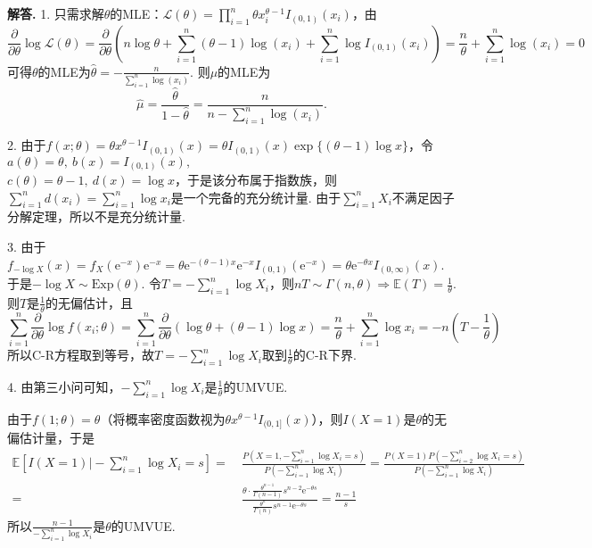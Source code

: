\documentclass[12pt, a4paper, oneside]{ctexart}
\newenvironment{solution}[1][]{\par\noindent\textbf{#1解答. }}{\smallskip\par}  %
\def\E{\mathbb{E}}          %
\def\e{\mathrm{e}}          %
\def\L{\mathcal{L}}         %
\def\add{\vspace{1ex}}      %
\begin{document}
\begin{solution}
    1. 只需求解$\theta$的MLE：$\L(\theta) = \prod_{i=1}^n\theta x_i^{\theta-1}I_{(0,1)}(x_i)$，由
    \begin{equation*}
        \frac{\partial}{\partial \theta}\log\L(\theta) = \frac{\partial}{\partial \theta}\left(n\log\theta+\sum_{i=1}^n(\theta-1)\log(x_i)+\sum_{i=1}^n\log I_{(0,1)}(x_i)\right) = \frac{n}{\theta}+\sum_{i=1}^n\log(x_i) = 0
    \end{equation*}
    可得$\theta$的MLE为$\hat{\theta} = -\frac{n}{\sum_{i=1}^n\log(x_i)}$. 则$\mu$的MLE为
    \begin{equation*}
        \hat{\mu} = \frac{\hat{\theta}}{1-\hat{\theta}} = \frac{n}{n-\sum_{i=1}^n\log(x_i)}.
    \end{equation*}
    
    2. 由于$f(x;\theta) = \theta x^{\theta-1}I_{(0,1)}(x) = \theta I_{(0,1)}(x)\exp\{(\theta-1)\log x\}$，令$a(\theta) = \theta,\ b(x)  = I_{(0,1)}(x),$\\$c(\theta) = \theta-1,\ d(x) = \log x$，于是该分布属于指数族，则$\sum_{i=1}^nd(x_i) = \sum_{i=1}^n\log x_i$是一个完备的充分统计量. 由于$\sum_{i=1}^nX_i$不满足因子分解定理，所以不是充分统计量.

    3. 由于$f_{-\log X}(x) = f_X(\e^{-x})\e^{-x} = \theta\e^{-(\theta-1)x}\e^{-x}I_{(0,1)}(\e^{-x})=\theta\e^{-\theta x}I_{(0,\infty)}(x)$. \add 于是$-\log X\sim \text{Exp}(\theta)$. 令$T = -\sum_{i=1}^n\log X_i$，则$nT\sim\Gamma(n,\theta) \Rightarrow \E(T) = \frac{1}{\theta}$. 则$T$是$\frac{1}{\theta}$的无偏估计，且
    \begin{equation*}
        \sum_{i=1}^n\frac{\partial}{\partial\theta}\log f(x_i;\theta) = \sum_{i=1}^n\frac{\partial}{\partial\theta}(\log\theta+(\theta-1)\log x)=\frac{n}{\theta}+\sum_{i=1}^n\log x_i= -n\left(T-\frac{1}{\theta}\right)
    \end{equation*}
    所以C-R方程取到等号，故$T=-\sum_{i=1}^n\log X_i$取到$\frac{1}{\theta}$的C-R下界.

    4. 由第三小问可知，$-\sum_{i=1}^n\log X_i$是$\frac{1}{\theta}$的UMVUE.

    由于$f(1;\theta) = \theta$（将概率密度函数视为$\theta x^{\theta-1}I_{(0,1]}(x)$），则$I(X=1)$是$\theta$的无偏估计量，于是
    \begin{align*}
        \E\left[I(X=1)\biggl|-\sum_{i=1}^n\log X_i=s\right] =&\ \frac{P(X=1,-\sum_{i=1}^n\log X_i=s)}{P\left(-\sum_{i=1}^n\log X_i\right)} 
        = \frac{P(X=1)P(-\sum_{i=2}^n\log X_i=s)}{P\left(-\sum_{i=1}^n\log X_i\right)}\\
        =&\ \frac{\theta\cdot\frac{\theta^{n-1}}{\Gamma(n-1)}s^{n-2}\e^{-\theta s}}{\frac{\theta^{n}}{\Gamma(n)}s^{n-1}\e^{-\theta s}}=\frac{n-1}{s}
    \end{align*}
    所以$\frac{n-1}{-\sum_{i=1}^n\log X_i}$是$\theta$的UMVUE.\add
\end{solution}
\end{document}
